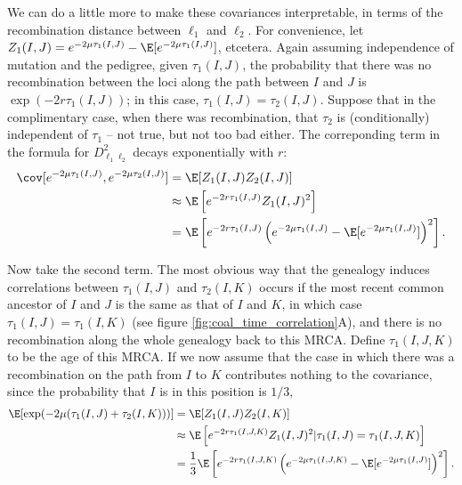 We can do a little more to make these covariances interpretable,
in terms of the recombination distance between $\ell_1$ and $\ell_2$.
For convenience, let $Z_1(I,J) = e^{-2\mu \tau_1(I,J)} - \E[e^{-2\mu \tau_1(I,J)}]$, etcetera.
Again assuming independence of mutation and the pedigree,
given $\tau_1(I,J)$,
the probability that there was no recombination between the loci along the path between $I$ and $J$
is $\exp(- 2r\tau_1(I,J))$;
in this case, $\tau_1(I,J) = \tau_2(I,J)$.
Suppose that in the complimentary case, when there was recombination, that $\tau_2$ is (conditionally) independent of $\tau_1$ --
not true, but not too bad either.
The correponding term in the formula for $D_{\ell_1 \ell_2}^2$ decays exponentially with $r$:
\begin{align}
  \cov[ e^{-2\mu\tau_1(I,J)}, e^{-2\mu \tau_2(I,J)} ] &= \E[ Z_1(I,J) Z_2(I,J) ]  \\
        &\approx \E\left[ e^{-2r \tau_1(I,J)} Z_1(I,J)^2  \right] \\
        &= \E\left[ e^{-2r \tau_1(I,J)} \left( e^{-2\mu \tau_1(I,J)} - \E[e^{-2\mu \tau_1(I,J)}] \right)^2 \right] .
\end{align}

Now take the second term.
The most obvious way that the genealogy induces correlations between $\tau_1(I,J)$ and $\tau_2(I,K)$
occurs if the most recent common ancestor of $I$ and $J$ is the same as that of $I$ and $K$,
in which case $\tau_1(I,J) = \tau_1(I,K)$ (see figure \ref{fig:coal_time_correlation}A),
and there is no recombination along the whole genealogy back to this MRCA.
Define $\tau_1(I,J,K)$ to be the age of this MRCA.
If we now assume that the case in which there was a recombination on the path from $I$ to $K$ contributes nothing to the covariance,
since the probability that $I$ is in this position is $1/3$,
\begin{align}
  \E[ \exp(-2\mu(\tau_1(I,J)+\tau_2(I,K))) ] &= \E[ Z_1(I,J) Z_2(I,K) ] \\
  &\approx \E \left[ e^{-2r \tau_1(I,J,K)} Z_1(I,J)^2 \vert \tau_1(I,J) = \tau_1(I,J,K)  \right] \\
  &= \frac{1}{3} \E \left[ e^{-2r \tau_1(I,J,K)} \left( e^{-2\mu \tau_1(I,J,K)} - \E[e^{-2\mu \tau_1(I,J)}] \right)^2 \right] .
\end{align}


